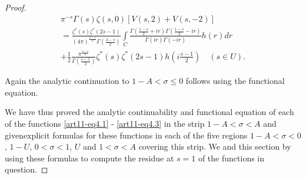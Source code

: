 \begin{proof}
\begin{gather*}
\pi^{-s} \Gamma (s) \zeta (s,0) [V (s,2) + V(s,-2)]\\
= \frac{\zeta^\ast (s)\zeta^\ast (2s -1)}{(4 \pi)^{\frac{2-s}{2}} \Gamma \left(\frac{2-s}{2} \right) } \int\limits_C \frac{\Gamma \left(\frac{1-s}{2} + ir \right) \Gamma \left(\frac{1-s}{2}  - ir\right)}{\Gamma(ir) \Gamma (-ir)} h (r) dr \tag{4.11}\label{art11-eq4.11}\\
+ \frac{1}{2} \frac{\pi^{\frac{s-1}{2}}}{\Gamma \left(\frac{s-1}{2} \right)} \zeta^\ast (s) \zeta^\ast (2s -1) h (i \frac{s-1}{2}) \quad (s \in U).
\end{gather*}

Again the analytic continuation to $1 - A < \sigma \leqslant 0$ follows using the functional equation.

We have thus proved the analytic continuability and functional equation of each of the functions \eqref{art11-eq4.1} - \eqref{art11-eq4.3} in the strip $1 - A < \sigma < A$ and given\pageoriginale explicit formulas for these functions in each of the five regions $1 - A < \sigma < 0$, $1 - U$, $0< \sigma < 1$, $U$ and $1 <\sigma < A$ covering this strip. We and this section by using these formulas to compute the residue at $s =1$ of the functions in question. 


\end{proof}
